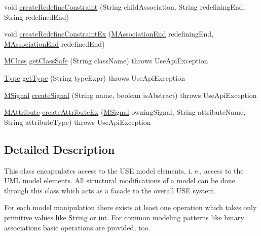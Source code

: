 \begin{DoxyCompactItemize}
\item 
void \hyperlink{classorg_1_1tzi_1_1use_1_1api_1_1_use_model_api_a748f41126d1061485f2c6537b5a1ab52}{create\-Redefine\-Constraint} (String child\-Association, String redefining\-End, String redefined\-End)
\item 
void \hyperlink{classorg_1_1tzi_1_1use_1_1api_1_1_use_model_api_a5ca10162c66b1951c71ccd179450162c}{create\-Redefine\-Constraint\-Ex} (\hyperlink{classorg_1_1tzi_1_1use_1_1uml_1_1mm_1_1_m_association_end}{M\-Association\-End} redefining\-End, \hyperlink{classorg_1_1tzi_1_1use_1_1uml_1_1mm_1_1_m_association_end}{M\-Association\-End} redefined\-End)
\item 
\hyperlink{interfaceorg_1_1tzi_1_1use_1_1uml_1_1mm_1_1_m_class}{M\-Class} \hyperlink{classorg_1_1tzi_1_1use_1_1api_1_1_use_model_api_a139113609fe23fd175f2836874ccb64f}{get\-Class\-Safe} (String class\-Name)  throws Use\-Api\-Exception 
\item 
\hyperlink{interfaceorg_1_1tzi_1_1use_1_1uml_1_1ocl_1_1type_1_1_type}{Type} \hyperlink{classorg_1_1tzi_1_1use_1_1api_1_1_use_model_api_ac957cdad6a6c21bc02701a8e74355394}{get\-Type} (String type\-Expr)  throws Use\-Api\-Exception 
\item 
\hyperlink{interfaceorg_1_1tzi_1_1use_1_1uml_1_1mm_1_1commonbehavior_1_1communications_1_1_m_signal}{M\-Signal} \hyperlink{classorg_1_1tzi_1_1use_1_1api_1_1_use_model_api_a015bff8a2af3d13c8ef45bea32e5350c}{create\-Signal} (String name, boolean is\-Abstract)  throws Use\-Api\-Exception 
\item 
\hyperlink{classorg_1_1tzi_1_1use_1_1uml_1_1mm_1_1_m_attribute}{M\-Attribute} \hyperlink{classorg_1_1tzi_1_1use_1_1api_1_1_use_model_api_afa3d58e942eaea1b16958d2ad3b3ada0}{create\-Attribute\-Ex} (\hyperlink{interfaceorg_1_1tzi_1_1use_1_1uml_1_1mm_1_1commonbehavior_1_1communications_1_1_m_signal}{M\-Signal} owning\-Signal, String attribute\-Name, String attribute\-Type)  throws Use\-Api\-Exception 
\end{DoxyCompactItemize}


\subsection{Detailed Description}
This class encapsulates access to the U\-S\-E model elements, i. e., access to the U\-M\-L model elements. All structural modifications of a model can be done through this class which acts as a facade to the overall U\-S\-E system.

For each model manipulation there exists at least one operation which takes only primitive values like {\ttfamily String} or {\ttfamily int}. For common modeling patterns like binary associations basic operations are provided, too.

